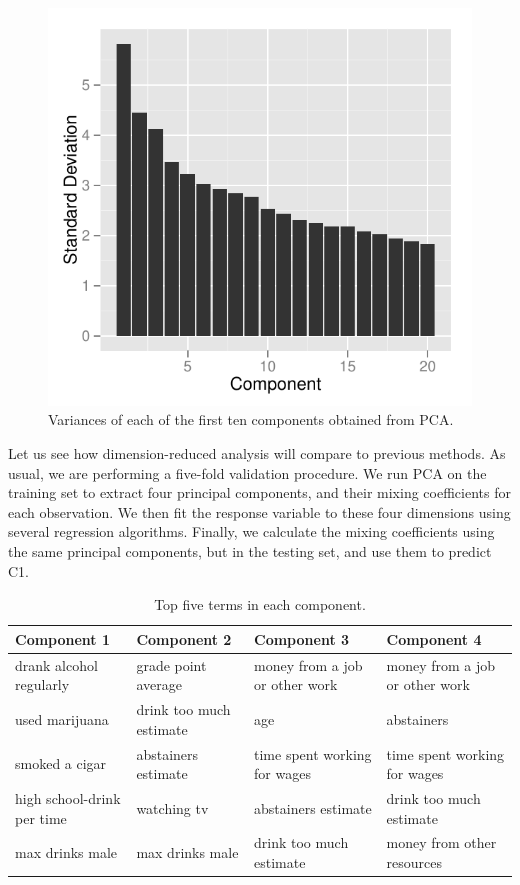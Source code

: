 \begin{figure}
\centering
\includegraphics[scale=0.65]{components.pdf}
\caption{Variances of each of the first ten components obtained from PCA.}
\label{components}
\end{figure}


Let us see how dimension-reduced analysis will compare to previous methods. As usual, we are performing a five-fold validation procedure. We run PCA on the training set to extract four principal components, and their mixing coefficients for each observation. We then fit the response variable to these four dimensions using several regression algorithms. Finally, we calculate the mixing coefficients using the same principal components, but in the testing set, and use them to predict C1. 


\begin{center}
\begin{table}[ht]
\begin{tabular}{l l l l}
\hline \hline
Component 1 & Component 2 &Component 3&Component 4\\ \hline 
drank alcohol regularly &		grade point average		&money from a job or other work&money from a job or other work\\
used marijuana  &		drink too much estimate	&age					&	abstainers\\
smoked a cigar&		abstainers estimate		&time spent working for wages	&time spent working for wages\\
high school-drink per time&watching tv			&abstainers estimate		&drink too much estimate\\
max drinks male&		max drinks male		&drink too much estimate		&money from other resources\\
\hline
\end{tabular}
\caption{Top five terms in each component.}
\label{components}
\end{table}
\end{center}

